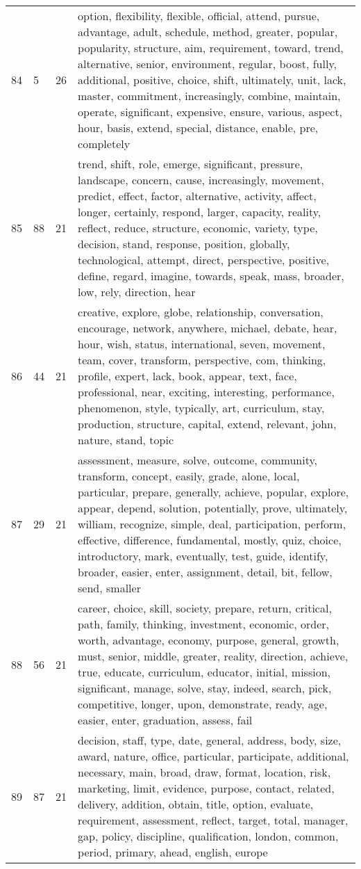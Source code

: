 \begin{table}[ht]
{\begin{tabularx}{\textwidth}{llrX}
   84 & 5 & 26 & option, flexibility, flexible, official, attend, pursue, advantage, adult, schedule, method, greater, popular, popularity, structure, aim, requirement, toward, trend, alternative, senior, environment, regular, boost, fully, additional, positive, choice, shift, ultimately, unit, lack, master, commitment, increasingly, combine, maintain, operate, significant, expensive, ensure, various, aspect, hour, basis, extend, special, distance, enable, pre, completely \\ 
   85 & 88 & 21 & trend, shift, role, emerge, significant, pressure, landscape, concern, cause, increasingly, movement, predict, effect, factor, alternative, activity, affect, longer, certainly, respond, larger, capacity, reality, reflect, reduce, structure, economic, variety, type, decision, stand, response, position, globally, technological, attempt, direct, perspective, positive, define, regard, imagine, towards, speak, mass, broader, low, rely, direction, hear \\ 
   86 & 44 & 21 & creative, explore, globe, relationship, conversation, encourage, network, anywhere, michael, debate, hear, hour, wish, status, international, seven, movement, team, cover, transform, perspective, com, thinking, profile, expert, lack, book, appear, text, face, professional, near, exciting, interesting, performance, phenomenon, style, typically, art, curriculum, stay, production, structure, capital, extend, relevant, john, nature, stand, topic \\ 
   87 & 29 & 21 & assessment, measure, solve, outcome, community, transform, concept, easily, grade, alone, local, particular, prepare, generally, achieve, popular, explore, appear, depend, solution, potentially, prove, ultimately, william, recognize, simple, deal, participation, perform, effective, difference, fundamental, mostly, quiz, choice, introductory, mark, eventually, test, guide, identify, broader, easier, enter, assignment, detail, bit, fellow, send, smaller \\ 
   88 & 56 & 21 & career, choice, skill, society, prepare, return, critical, path, family, thinking, investment, economic, order, worth, advantage, economy, purpose, general, growth, must, senior, middle, greater, reality, direction, achieve, true, educate, curriculum, educator, initial, mission, significant, manage, solve, stay, indeed, search, pick, competitive, longer, upon, demonstrate, ready, age, easier, enter, graduation, assess, fail \\ 
   89 & 87 & 21 & decision, staff, type, date, general, address, body, size, award, nature, office, particular, participate, additional, necessary, main, broad, draw, format, location, risk, marketing, limit, evidence, purpose, contact, related, delivery, addition, obtain, title, option, evaluate, requirement, assessment, reflect, target, total, manager, gap, policy, discipline, qualification, london, common, period, primary, ahead, english, europe \\ 

\end{tabularx}}
\end{table}
